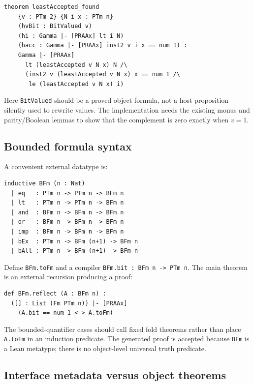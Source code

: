 \begin{lstlisting}[language={},caption={Target theorem for the search adapter}]
theorem leastAccepted_found
    {v : PTm 2} {N i x : PTm n}
    (hvBit : BitValued v)
    (hi : Gamma |- [PRAAx] lt i N)
    (hacc : Gamma |- [PRAAx] inst2 v i x == num 1) :
    Gamma |- [PRAAx]
      lt (leastAccepted v N x) N /\
      (inst2 v (leastAccepted v N x) x == num 1 /\
       le (leastAccepted v N x) i)
\end{lstlisting}

Here \texttt{BitValued} should be a proved object formula, not a host
proposition silently used to rewrite values.  The implementation needs the
existing monus and parity/Boolean lemmas to show that the complement is zero
exactly when \(v=1\).

\subsection{Bounded formula syntax}

A convenient external datatype is:

\begin{lstlisting}[language={},caption={Metalevel fixed bounded formulas}]
inductive BFm (n : Nat)
  | eq   : PTm n -> PTm n -> BFm n
  | lt   : PTm n -> PTm n -> BFm n
  | and  : BFm n -> BFm n -> BFm n
  | or   : BFm n -> BFm n -> BFm n
  | imp  : BFm n -> BFm n -> BFm n
  | bEx  : PTm n -> BFm (n+1) -> BFm n
  | bAll : PTm n -> BFm (n+1) -> BFm n
\end{lstlisting}

Define \texttt{BFm.toFm} and a compiler \texttt{BFm.bit : BFm n -> PTm n}.
The main theorem is an external recursion producing a proof:

\begin{lstlisting}[language={},caption={Reflection endpoint}]
def BFm.reflect (A : BFm n) :
  ([] : List (Fm PTm n)) |- [PRAAx]
    (A.bit == num 1 <-> A.toFm)
\end{lstlisting}

The bounded-quantifier cases should call fixed fold theorems rather than place
\texttt{A.toFm} in an induction predicate.  The generated proof is accepted
because \texttt{BFm} is a Lean metatype; there is no object-level universal
truth predicate.

\subsection{Interface metadata versus object theorems}

